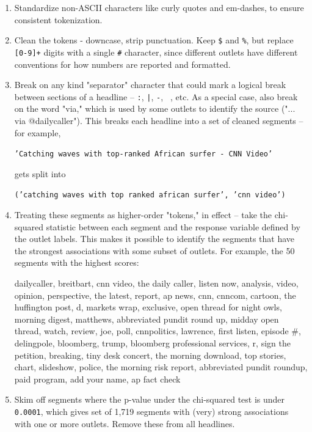 \documentclass{scrartcl}
\begin{document}
\begin{enumerate}
\item Standardize non-ASCII characters like curly quotes and em-dashes, to ensure consistent tokenization.

\item Clean the tokens - downcase, strip punctuation. Keep \texttt{\$} and \texttt{\%}, but replace \texttt{[0-9]+} digits with a single \texttt{\#} character, since different outlets have different conventions for how numbers are reported and formatted.

\item Break on any kind "separator" character that could mark a logical break between sections of a headline -- \texttt{:}, \texttt{|}, \texttt{-}, \texttt{~}, etc. As a special case, also break on the word "via," which is used by some outlets to identify the source ("... via @dailycaller"). This breaks each headline into a set of cleaned segments -- for example,

\texttt{'Catching waves with top-ranked African surfer - CNN Video'}

gets split into

\texttt{('catching waves with top ranked african surfer', 'cnn video')}

\item Treating these segments as higher-order "tokens," in effect -- take the chi-squared statistic between each segment and the response variable defined by the outlet labels. This makes it possible to identify the segments that have the strongest associations with some subset of outlets. For example, the 50 segments with the highest scores:

\begin{displayquote}
\small \raggedright dailycaller, breitbart, cnn video, the daily caller, listen now, analysis, video, opinion, perspective, the latest, report, ap news, cnn, cnncom, cartoon, the huffington post, d, markets wrap, exclusive, open thread for night owls, morning digest, matthews, abbreviated pundit round up, midday open thread, watch, review, joe, poll, cnnpolitics, lawrence, first listen, episode \#, delingpole, bloomberg, trump, bloomberg professional services, r, sign the petition, breaking, tiny desk concert, the morning download, top stories, chart, slideshow, police, the morning risk report, abbreviated pundit roundup, paid program, add your name, ap fact check
\end{displayquote}

\item Skim off segments where the p-value under the chi-squared test is under \texttt{0.0001}, which gives set of 1,719 segments with (very) strong associations with one or more outlets. Remove these from all headlines.
\end{enumerate}
\end{document}
